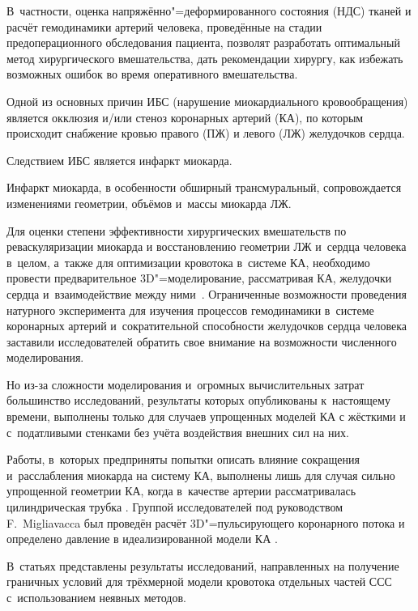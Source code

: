 В~частности, оценка напряжённо"=деформированного состояния (НДС) тканей и расчёт гемодинамики артерий человека, проведённые на стадии предоперационного обследования пациента, позволят разработать оптимальный метод хирургического вмешательства, дать рекомендации хирургу, как избежать возможных ошибок во время оперативного вмешательства.



\smallskip




Одной из основных причин ИБС (нарушение миокардиального кровообращения) является окклюзия и/или стеноз коронарных артерий (КА), по которым происходит снабжение кровью правого (ПЖ) и левого (ЛЖ) желудочков сердца. 

Следствием ИБС является инфаркт миокарда. 

Инфаркт миокарда, в особенности обширный трансмуральный, сопровождается изменениями геометрии, объёмов и~массы миокарда ЛЖ. 

Для оценки степени эффективности хирургических вмешательств по реваскуляризации миокарда и восстановлению геометрии ЛЖ и~сердца человека в~целом, а~также для оптимизации кровотока в~системе КА, необходимо провести предварительное 3D"=моделирование, рассматривая КА, желудочки сердца и~взаимодействие между ними~\cite{gol:3}. Ограниченные возможности проведения натурного эксперимента для изучения процессов гемодинамики в~системе коронарных артерий и~сократительной способности желудочков сердца человека заставили исследователей обратить свое внимание на возможности численного моделирования. 

Но из-за сложности моделирования и~огромных вычислительных затрат большинство исследований, результаты которых опубликованы к~настоящему времени, выполнены только для случаев упрощенных моделей КА с жёсткими \cite{gol:4, gol:5} и с~податливыми \cite{gol:6, gol:7} стенками без учёта воздействия внешних сил на них. 

Работы, в~которых предприняты попытки описать влияние сокращения и~расслабления миокарда на систему КА, выполнены лишь для случая сильно упрощенной геометрии КА, когда в~качестве артерии рассматривалась цилиндрическая трубка \cite{gol:8, gol:9}. Группой исследователей под руководством F.~Migliavacca \cite{gol:10, gol:11} был проведён расчёт 3D"=пульсирующего коронарного потока и определено давление в идеализированной модели КА \cite{gol:12}. 

В~статьях \cite{gol:13, gol:14} представлены результаты исследований, направленных на получение граничных условий для трёхмерной модели кровотока отдельных частей ССС с~использованием неявных методов. 

